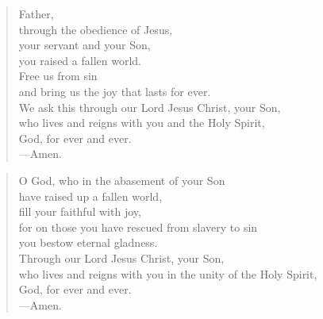 \prayer

\setlength{\leftmargini}{\prayerleftmargini}

\begin{verse}
Father,\\
through the obedience of Jesus,\\
your servant and your Son,\\
you raised a fallen world.\\
Free us from sin\\
and bring us the joy that lasts for ever.\\
We ask this through our Lord Jesus Christ, your Son,\\
who lives and reigns with you and the Holy Spirit,\\
God, for ever and ever.\\
{\color{red}---\thinspace}Amen.
\end{verse}


\begin{verse}
O God, who in the abasement of your Son\\
have raised up a fallen world,\\
fill your faithful with joy,\\
for on those you have rescued from slavery to sin\\
you bestow eternal gladness.\\
Through our Lord Jesus Christ, your Son,\\
who lives and reigns with you in the unity of the Holy Spirit,\\
God, for ever and ever.\\
{\color{red}---\thinspace}Amen.
\end{verse}

\setlength{\leftmargini}{\defleftmargini}